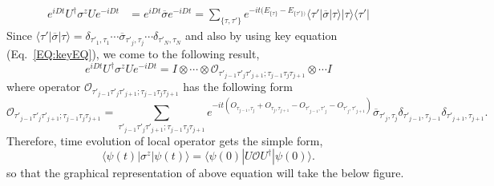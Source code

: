 \documentclass[aps,prb,onecolumn,groupedaddress,notitlepage,showpacs,floatfix,superscriptaddress]{revtex4-1}
\begin{document}
\begin{eqnarray*}
e^{iDt} U^{\dagger} \sigma^{z} U e^{-iDt}&=e^{iDt} \overline{\sigma} e^{-iDt}=\sum_{\{\tau,\tau'\}}  e^{-it(E_{\{\tau\}}-E_{\{\tau'\})} } \langle \tau'| \overline{\sigma}|\tau \rangle |\tau \rangle \langle\tau'|
\end{eqnarray*}
Since $ \langle \tau'| \overline{\sigma}|\tau\rangle=\delta_{\tau'_{1},\tau_{1}} \cdots \overline{\sigma} _{\tau'_{j},\tau_{j}}  \cdots  \delta_{\tau'_{N},\tau_{N}}$ and also by using key equation (Eq.~\ref{EQ:keyEQ}), we come to the following result,
\begin{equation*}
e^{iDt} U^{\dagger} \sigma^{z} U e^{-iDt}=I\otimes\cdots\otimes\mathcal{O}_{\tau'_{j-1}\tau'_{j}\tau'_{j+1};\tau_{j-1}\tau_{j}\tau_{j+1} } \otimes \cdots I
\end{equation*}
where operator $\mathcal{O}_{\tau'_{j-1}\tau'_{j}\tau'_{j+1};\tau_{j-1}\tau_{j}\tau_{j+1} }$ has the following form
\begin{equation*}
\mathcal{O}_{\tau'_{j-1}\tau'_{j}\tau'_{j+1};\tau_{j-1}\tau_{j}\tau_{j+1} }=\sum_{\tau'_{j-1}\tau'_{j}\tau'_{j+1};\tau_{j-1}\tau_{j}\tau_{j+1}} 
e^{-it(O_{\tau_{j-1},\tau_{j}}+O_{\tau_{j},\tau_{j+1}}-O_{\tau'_{j-1},\tau'_{j}}-O_{\tau'_{j},\tau'_{j+1}})}       
\overline{\sigma} _{\tau'_{j},\tau_{j}}    \delta_{\tau'_{j-1},\tau_{j-1}} \delta_{\tau'_{j+1},\tau_{j+1}}. 
\end{equation*}
Therefore, time evolution of local operator gets the simple form, 
\begin{equation*}
\langle \psi(t) | \sigma^{z} |\psi(t)\rangle=\langle \psi(0)|U\mathcal{O} U^{\dagger}|\psi(0)\rangle.
\end{equation*}
so that the graphical representation of above equation will take the below figure.
\end{document}
